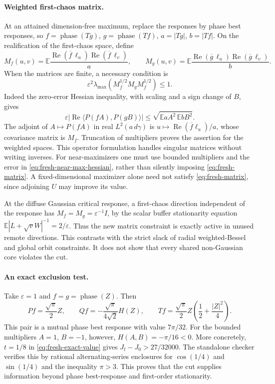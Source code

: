 \paragraph{Weighted first-chaos matrix.}
At an attained dimension-free maximum, replace the responses by phase
best responses, so $f=\operatorname{phase}(Tg)$,
$g=\operatorname{phase}(Tf)$, $a=|Tg|$, $b=|Tf|$.
On the realification of the first-chaos space, define
\[
 M_f(u,v)=\mathbb E\frac{
 \operatorname{Re}(\overline f\,\ell_u)
 \operatorname{Re}(\overline f\,\ell_v)}{a},
 \qquad
 M_g(u,v)=\mathbb E\frac{
 \operatorname{Re}(\overline g\,\ell_u)
 \operatorname{Re}(\overline g\,\ell_v)}{b}.
\]
When the matrices are finite, a necessary condition is
\begin{equation}\label{eq:fresh-matrix}
 \boxed{\varepsilon^2\lambda_{\max}
       (M_f^{1/2}M_gM_f^{1/2})\le1.}
\end{equation}
Indeed the zero-error Hessian inequality, with scaling and a sign change
of $B$, gives
\[
 \varepsilon|\operatorname{Re}\langle P(fA),P(gB)\rangle|
 \le\sqrt{\mathbb EaA^2\,\mathbb EbB^2}.
\]
The adjoint of $A\mapsto P(fA)$ in real $L^2(a\,d\gamma)$ is
$u\mapsto\operatorname{Re}(\overline f\ell_u)/a$, whose covariance
matrix is $M_f$. Truncation of multipliers proves the assertion for
the weighted spaces. This operator formulation handles singular
matrices without writing inverses. For near-maximizers one must use
bounded multipliers and the error in
\eqref{eq:fresh-near-max-hessian}, rather than silently imposing
\eqref{eq:fresh-matrix}. A fixed-dimensional maximizer alone need not
satisfy \eqref{eq:fresh-matrix}, since adjoining $U$ may improve its value.

At the diffuse Gaussian critical response, a first-chaos direction
independent of the response has
$M_f=M_g=\varepsilon^{-1}I$, by the scalar buffer stationarity equation
$\mathbb E|L+\sqrt vW|^{-1}=2/\varepsilon$. Thus the new matrix constraint
is exactly active in unused remote directions. This contrasts with the
strict slack of radial weighted-Bessel and global orbit constraints.
It does not show that every shared non-Gaussian core violates the cut.

\paragraph{An exact exclusion test.}
Take $\varepsilon=1$ and $f=g=\operatorname{phase}(Z)$. Then
\[
 Pf=\frac{\sqrt\pi}2 Z,\qquad
 Qf=-\frac{\sqrt\pi}{4\sqrt2}H(Z),\qquad
 Tf=\frac{\sqrt\pi}2 Z\left(\frac12+\frac{|Z|^2}4\right).
\]
This pair is a mutual phase best response with value $7\pi/32$.
For the bounded multipliers $A=1$, $B=-1$, however,
$H(A,B)=-\pi/16<0$. More concretely, $t=1/8$ in
\eqref{eq:fresh-exact-value} gives $J_t-J_0>27/32000$.
The standalone checker verifies this by rational alternating-series
enclosures for $\cos(1/4)$ and $\sin(1/4)$ and the inequality $\pi>3$.
This proves that the cut supplies information beyond phase
best-response and first-order stationarity.

